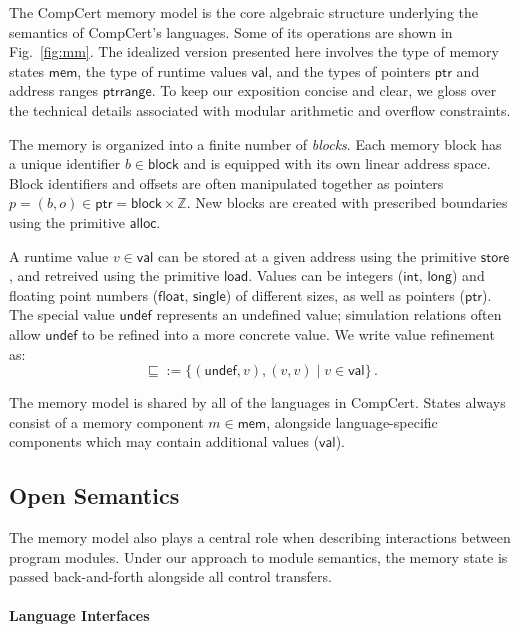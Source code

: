 \documentclass[sigplan,10pt,review,anonymous]{acmart}\settopmatter{printfolios=true,printccs=false,printacmref=false}
\newcommand{\kw}[1]{\ensuremath{ \mathsf{#1} }}
\begin{document}
The CompCert memory model \cite{compcertmm,compcertmmv2}
is the core algebraic structure
underlying the semantics of CompCert's languages.
Some of its operations
are shown in Fig.~\ref{fig:mm}.
The idealized version presented here
involves
the type of memory states \kw{mem},
the type of runtime values \kw{val}, and
the types of pointers \kw{ptr} and address ranges \kw{ptrrange}.
To keep our exposition concise and clear,
we gloss over the technical details
associated with modular arithmetic and overflow constraints.

The memory is organized into a finite number of \emph{blocks}.
Each memory block has a unique identifier $b \in \kw{block}$
and is equipped with its own linear address space.
Block identifiers and offsets are often manipulated together
as pointers $p = (b, o) \in \kw{ptr} = \kw{block} \times \mathbb{Z}$.
New blocks are created with prescribed boundaries
using the primitive $\kw{alloc}$.

A runtime value $v \in \kw{val}$ can be stored at
a given address using the primitive \kw{store},
and retreived using the primitive \kw{load}.
Values can be integers (\kw{int}, \kw{long}) and
floating point numbers (\kw{float}, \kw{single})
of different sizes,
as well as pointers (\kw{ptr}).
The special value \kw{undef}
represents an undefined value;
simulation relations
often allow $\kw{undef}$
to be refined into a more concrete value.
We write value refinement as:
\[
    {\sqsubseteq} := \{(\kw{undef}, v), (v, v) \mid v \in \kw{val}\} \,.
\]

The memory model is shared by all of the languages in CompCert.
States always consist of
a memory component $m \in \kw{mem}$,
alongside language-specific components
which may contain additional values ($\kw{val}$).


\subsection{Open Semantics} \label{sec:sem:open} %

The memory model also plays a central role
when describing interactions between program modules.
Under our approach to module semantics,
the memory state is passed back-and-forth
alongside all control transfers.

\paragraph{Language Interfaces} %
\end{document}
